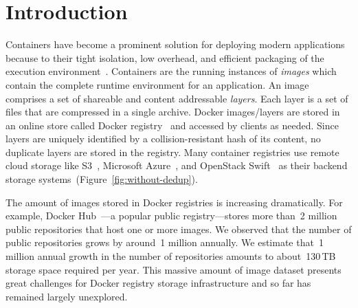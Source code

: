\section{Introduction}
 
Containers have become a prominent solution for deploying modern applications because to their tight isolation, low overhead, and efficient packaging of the execution environment~\cite{docker}.
Containers are the running instances of \emph{images} which contain the complete runtime environment for an application.
An image comprises a set of shareable and content addressable \emph{layers}.
Each layer is a set of files that are compressed in a single archive. 
Docker images/layers are stored in an online store called Docker registry~\cite{docker-hub} and accessed by clients as needed.
Since layers are uniquely identified by a collision-resistant hash of its content, 
no duplicate layers are stored in the registry.
Many container registries use remote cloud storage like S3~\cite{s3}, 
Microsoft Azure~\cite{azure}, and OpenStack Swift~\cite{swift} as their backend storage systems~(Figure~\ref{fig:without-dedup}).

The amount of images stored in Docker registries is increasing dramatically.
For example, Docker Hub~\cite{docker-hub}---a popular public registry---stores more than~2 million public repositories that host one or more images. 
We observed that the number of public repositories grows by around~1 million annually. 
We estimate that~1 million annual growth in the number of repositories 
amounts to about~130\,TB storage space required per year.
This massive amount of image dataset presents great challenges for Docker registry storage infrastructure and so far has remained largely unexplored.


